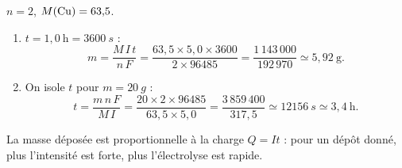 \documentclass[11pt,a4paper]{article}
\begin{document}
\begin{corr}
$n=2$, $M(\ce{Cu})=63{,}5$.
\begin{enumerate}[label=\textbf{\alph*)},leftmargin=2.2em,topsep=2pt,itemsep=2pt]
  \item $t = 1{,}0\ \mathrm{h} = \SI{3600}{s}$ :
        \[
        m = \frac{M\,I\,t}{n\,F} = \frac{63{,}5\times 5{,}0\times 3600}{2\times 96485}
        = \frac{1\,143\,000}{192\,970} \simeq \boxed{5{,}92\ \mathrm{g}}.
        \]
  \item On isole $t$ pour $m=\SI{20}{g}$ :
        \[
        t = \frac{m\,n\,F}{M\,I} = \frac{20\times 2\times 96485}{63{,}5\times 5{,}0}
        = \frac{3\,859\,400}{317{,}5} \simeq \SI{12156}{s} \simeq \boxed{3{,}4\ \mathrm{h}}.
        \]
\end{enumerate}
La masse déposée est proportionnelle à la charge $Q=It$ : pour un dépôt donné, plus l'intensité est
forte, plus l'électrolyse est rapide.
\end{corr}
\end{document}
